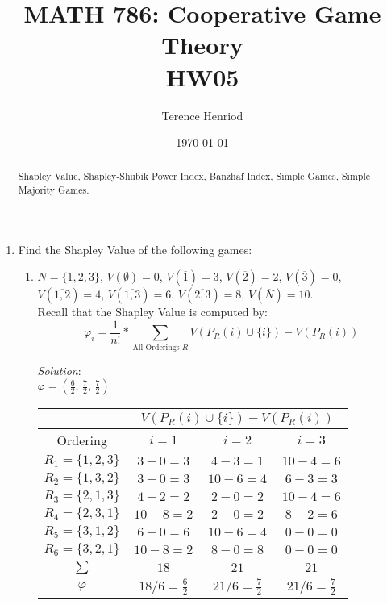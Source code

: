 \documentclass{article}
\title{MATH 786: Cooperative Game Theory \\ HW05}
\author{Terence Henriod}
\date{\today}
\begin{document}
\maketitle

\begin{abstract}
Shapley Value, Shapley-Shubik Power Index, Banzhaf Index, Simple Games, Simple Majority Games. 
\end{abstract}


\newpage
\begin{enumerate}
\item Find the Shapley Value of the following games:
  \begin{enumerate}
  \item $N = \{1, 2, 3\}$, $V(\emptyset) = 0$, $V(\overline{1}) = 3$, $V(\overline{2}) = 2$, $V(\overline{3}) = 0$, $V(\overline{1,2}) = 4$, $V(\overline{1,3}) = 6$, $V(\overline{2,3}) = 8$, $V(\overline{N}) = 10$. \\

  Recall that the Shapley Value is computed by:
  \[ \varphi_{i} = \frac{1}{n!} * \sum_{\text{All Orderings } R}{V(P_{R}(i) \cup \{i\}) - V(P_{R}(i))} \]

  \textit{Solution}:\\

  $ \varphi = (\frac{6}{2},\, \frac{7}{2},\, \frac{7}{2}) $ \\

  \begin{tabular}{| c || c | c | c |}
  \hline
           & \multicolumn{3}{c|}{$V(P_{R}(i) \cup \{i\}) - V(P_{R}(i))$} \\[0.3em]
  \hline
  Ordering               & $\;\quad i = 1 \;\quad$  & $\;\quad i = 2 \;\quad$  & $\;\quad i = 3 \;\quad$  \\[0.3em]
  \hline\hline
  $R_{1} = \{1, 2, 3\}$  & $3  - 0 = 3$  & $4  - 3 = 1$  & $10 - 4 = 6$  \\[0.3em]
  $R_{2} = \{1, 3, 2\}$  & $3  - 0 = 3$  & $10 - 6 = 4$  & $6  - 3 = 3$  \\[0.3em]
  $R_{3} = \{2, 1, 3\}$  & $4  - 2 = 2$  & $2  - 0 = 2$  & $10 - 4 = 6$  \\[0.3em]
  $R_{4} = \{2, 3, 1\}$  & $10 - 8 = 2$  & $2  - 0 = 2$  & $8  - 2 = 6$  \\[0.3em]
  $R_{5} = \{3, 1, 2\}$  & $6  - 0 = 6$  & $10 - 6 = 4$  & $0  - 0 = 0$  \\[0.3em]
  $R_{6} = \{3, 2, 1\}$  & $10 - 8 = 2$  & $8  - 0 = 8$  & $0  - 0 = 0$  \\[0.3em]
  \hline
  $\sum$                 & $18$          & $21$          & $21$          \\[0.3em]
  \hline
  $\varphi$              & $18 / 6 = \frac{6}{2}$ & $21 / 6 = \frac{7}{2}$ & $21 / 6 = \frac{7}{2}$ \\[0.3em]
  \hline
  \end{tabular} \\
  \newline


\end{enumerate}
\end{enumerate}
\end{document}

